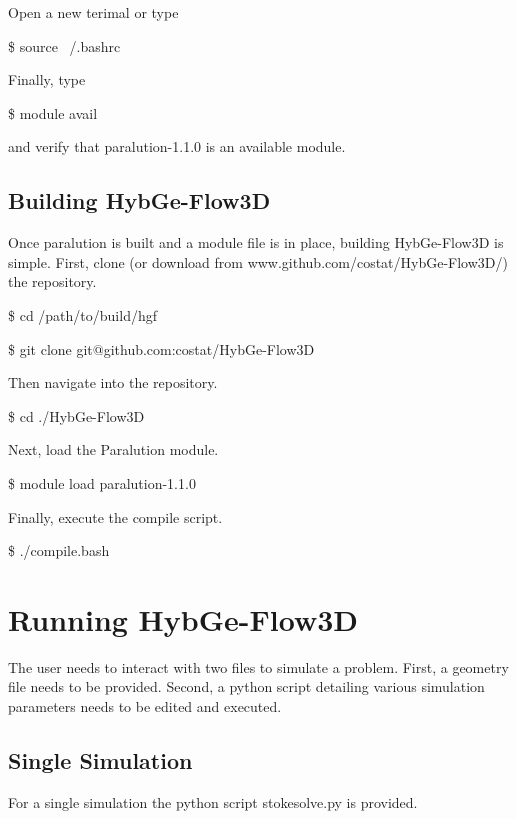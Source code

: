 \documentclass{report}
\begin{document}
\noindent Open a new terimal or type
\begin{mdframed}[style=MyFrame]
  \$ source ~/.bashrc
\end{mdframed}
Finally, type
\begin{mdframed}[style=MyFrame]
  \$ module avail
\end{mdframed}
and verify that paralution-1.1.0 is an available module.

\section{Building HybGe-Flow3D}

Once paralution is built and a module file is in place, building
HybGe-Flow3D is simple.
First, clone (or download from www.github.com/costat/HybGe-Flow3D/) the repository.
\begin{mdframed}[style=MyFrame]
  \$ cd /path/to/build/hgf

  \noindent\$ git clone git@github.com:costat/HybGe-Flow3D
\end{mdframed}
Then navigate into the repository.
\begin{mdframed}[style=MyFrame]
  \$ cd ./HybGe-Flow3D
\end{mdframed}
Next, load the Paralution module.
\begin{mdframed}[style=MyFrame]
  \$ module load paralution-1.1.0
\end{mdframed}
Finally, execute the compile script.
\begin{mdframed}[style=MyFrame]
  \$ ./compile.bash
\end{mdframed}

\chapter{Running HybGe-Flow3D}

The user needs to interact with two files to simulate a problem.
First, a geometry file needs to be provided. Second, a python script
detailing various simulation parameters needs to be edited and executed.

\section{Single Simulation}

For a single simulation the python script stokesolve.py is provided.
\end{document}
